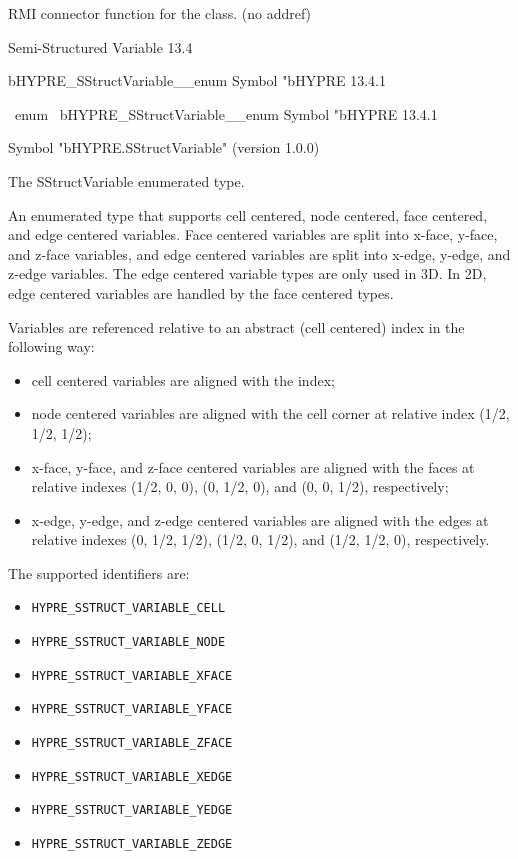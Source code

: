 \documentclass{article}
\begin{document}
\begin{cxxentry}
\begin{cxxentry}
\begin{cxxvariable}
\begin{cxxdoc}
RMI connector function for the class. (no addref)
\end{cxxdoc}
\end{cxxvariable}
\end{cxxentry}
\begin{cxxentry}
{}
        {Semi-Structured Variable}
        {}
        {
}
        {13.4}
\begin{cxxnames}
        {bHYPRE\_SStructVariable\_\_enum}
        {}
        {
Symbol "bHYPRE}
        {13.4.1}
\end{cxxnames}
\begin{cxxunion}
{\ enum\ }
        {bHYPRE\_SStructVariable\_\_enum}
        {}
        {
Symbol "bHYPRE}
        {13.4.1}
\begin{cxxdoc}

Symbol "bHYPRE.SStructVariable" (version 1.0.0)

The SStructVariable enumerated type.

An enumerated type that supports cell centered, node
centered, face centered, and edge centered variables.  Face
centered variables are split into x-face, y-face, and z-face
variables, and edge centered variables are split into x-edge,
y-edge, and z-edge variables.  The edge centered variable
types are only used in 3D.  In 2D, edge centered variables
are handled by the face centered types.

Variables are referenced relative to an abstract (cell centered)
index in the following way:
\begin{itemize}
\item cell centered variables are aligned with the index;
\item node centered variables are aligned with the cell corner
at relative index (1/2, 1/2, 1/2);
\item x-face, y-face, and z-face centered variables are aligned
with the faces at relative indexes (1/2, 0, 0), (0, 1/2, 0),
and (0, 0, 1/2), respectively;
\item x-edge, y-edge, and z-edge centered variables are aligned
with the edges at relative indexes (0, 1/2, 1/2), (1/2, 0, 1/2),
and (1/2, 1/2, 0), respectively.
\end{itemize}

The supported identifiers are:
\begin{itemize}
\item {\tt HYPRE\_SSTRUCT\_VARIABLE\_CELL}
\item {\tt HYPRE\_SSTRUCT\_VARIABLE\_NODE}
\item {\tt HYPRE\_SSTRUCT\_VARIABLE\_XFACE}
\item {\tt HYPRE\_SSTRUCT\_VARIABLE\_YFACE}
\item {\tt HYPRE\_SSTRUCT\_VARIABLE\_ZFACE}
\item {\tt HYPRE\_SSTRUCT\_VARIABLE\_XEDGE}
\item {\tt HYPRE\_SSTRUCT\_VARIABLE\_YEDGE}
\item {\tt HYPRE\_SSTRUCT\_VARIABLE\_ZEDGE}
\end{itemize}


\end{cxxdoc}
\end{cxxunion}
\end{cxxentry}
\end{cxxentry}
\end{document}
